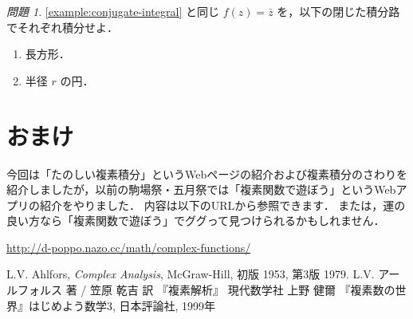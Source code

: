 \documentclass{ltjsarticle}
\theoremstyle{definition}
\theoremstyle{remark}
\newtheorem{exercise}[example]{問題}
\begin{document}
\begin{exercise}
  \autoref{example:conjugate-integral} と同じ $f(z)=\bar{z}$ を，以下の閉じた積分路でそれぞれ積分せよ．

  \begin{enumerate}
  \item 長方形．
    \begin{center}
    \end{center}

  \item 半径 $r$ の円．
  \end{enumerate}
\end{exercise}

\section*{おまけ}

今回は「たのしい複素積分」というWebページの紹介および複素積分のさわりを紹介しましたが，以前の駒場祭・五月祭では「複素関数で遊ぼう」というWebアプリの紹介をやりました．
内容は以下のURLから参照できます．
または，運の良い方なら「複素関数で遊ぼう」でググって見つけられるかもしれません．

\begin{center}
  \url{http://d-poppo.nazo.cc/math/complex-functions/}
\end{center}


\begin{thebibliography}{9}
  L.V. Ahlfors, \emph{Complex Analysis}, McGraw-Hill, 初版 1953, 第3版 1979.
  L.V. アールフォルス 著 / 笠原 乾吉 訳 『複素解析』 現代数学社
  上野 健爾 『複素数の世界』はじめよう数学3, 日本評論社, 1999年
\end{thebibliography}
\end{document}
